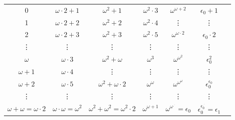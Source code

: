 \documentclass[a4paper]{article}
\begin{document}
\noindent\begin{tabular}{ccccccc}
  0                                 & $\omega\cdot 2 + 1$             & $\omega^2 + 1$                           & $\omega^2\cdot 3$     & $\omega^{\omega + 2}$                    & $\epsilon_0 + 1$                                 \\
  1                                 & $\omega\cdot 2 + 2$             & $\omega^2 + 2$                           & $\omega^2\cdot 4$     & \vdots                                   & \vdots                                           \\
  2                                 & $\omega\cdot 2 + 3$             & $\omega^2 + 3$                           & $\omega^2\cdot 5$     & $\omega^{\omega \cdot 2}$                & $\epsilon_0 \cdot 2$                             \\
  \vdots                            & \vdots                          & \vdots                                   & \vdots                & \vdots                                   & \vdots                                           \\
  $\omega$                          & $\omega\cdot 3$                 & $\omega^2 + \omega$                      & $\omega^3$            & $\omega^{\omega^2}$                      & $\epsilon_0^2$                                   \\
  $\omega + 1$                      & $\omega\cdot 4$                 & \vdots                                   & \vdots                & \vdots                                   & \vdots                                           \\
  $\omega + 2$                      & $\omega\cdot 5$                 & $\omega^2 + \omega \cdot 2$              & $\omega^\omega$       & $\omega^{\omega^{\omega}}$               & $\epsilon_0^{\epsilon_0}$                        \\
  \vdots                            & \vdots                          & \vdots                                   & \vdots                & \vdots                                   & \vdots                                           \\
  $\omega + \omega = \omega\cdot 2$ & $\omega\cdot \omega = \omega^2$ & $\omega^2 + \omega^2 = \omega^2 \cdot 2$ & $\omega^{\omega + 1}$ & $\omega^{\omega^{.^{.^.}}} = \epsilon_0$ & $\epsilon_0^{\epsilon_0^{.^{.^.}}} = \epsilon_1$ \\
\end{tabular}
\end{document}
